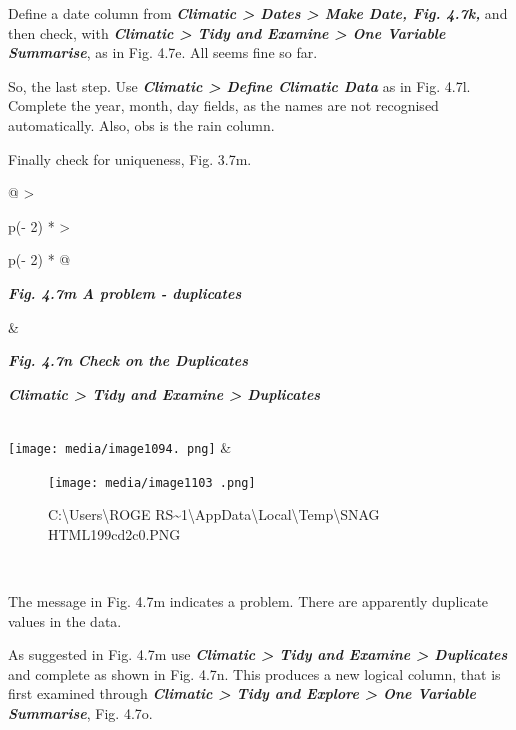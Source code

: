 \documentclass[
  letterpaper,
  DIV=11,
  numbers=noendperiod]{scrreprt}
\begin{document}
Define a date column from \textbf{\emph{Climatic \textgreater{} Dates
\textgreater{} Make Date, Fig. 4.7k,}} and then check, with
\textbf{\emph{Climatic \textgreater{} Tidy and Examine \textgreater{}
One Variable Summarise}}, as in Fig. 4.7e. All seems fine so far.

So, the last step. Use \textbf{\emph{Climatic \textgreater{} Define
Climatic Data}} as in Fig. 4.7l. Complete the year, month, day fields,
as the names are not recognised automatically. Also, obs is the rain
column.

Finally check for uniqueness, Fig. 3.7m.

\begin{longtable}[]{@{}
  >{\raggedright\arraybackslash}p{(\columnwidth - 2\tabcolsep) * }
  >{\raggedright\arraybackslash}p{(\columnwidth - 2\tabcolsep) * }@{}}
\toprule\noalign{}
\begin{minipage}[b]{\linewidth}\raggedright
\textbf{\emph{Fig. 4.7m A problem - duplicates}}
\end{minipage} & \begin{minipage}[b]{\linewidth}\raggedright
\textbf{\emph{Fig. 4.7n Check on the Duplicates}}

\textbf{\emph{Climatic \textgreater{} Tidy and Examine \textgreater{}
Duplicates}}
\end{minipage} \\
\midrule\noalign{}
\endhead
\bottomrule\noalign{}
\endlastfoot
\texttt{[image: media/image1094. png]}
& \begin{minipage}[t]{\linewidth}\raggedright
\begin{figure}[H]

{\centering \texttt{[image: media/image1103 .png]}

}

\caption{C:\textbackslash Users\textbackslash ROGE
RS\textasciitilde1\textbackslash AppData\textbackslash Local\textbackslash Temp\textbackslash SNAG
HTML199cd2c0.PNG}

\end{figure}%
\end{minipage} \\
\end{longtable}

The message in Fig. 4.7m indicates a problem. There are apparently
duplicate values in the data.

As suggested in Fig. 4.7m use \textbf{\emph{Climatic \textgreater{} Tidy
and Examine \textgreater{} Duplicates}} and complete as shown in Fig.
4.7n. This produces a new logical column, that is first examined through
\textbf{\emph{Climatic \textgreater{} Tidy and Explore \textgreater{}
One Variable Summarise}}, Fig. 4.7o.
\end{document}

